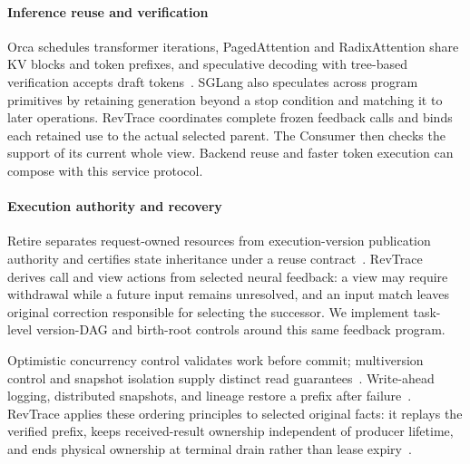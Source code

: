 \paragraph{Inference reuse and verification}
Orca schedules transformer iterations, PagedAttention and RadixAttention
share KV blocks and token prefixes, and speculative decoding with
tree-based verification accepts draft
tokens~\cite{yu2022orca,kwon2023pagedattention,zheng2024sglang,leviathan2023speculative,miao2024specinfer}.
SGLang also speculates across program primitives by retaining generation
beyond a stop condition and matching it to later operations. RevTrace coordinates
complete frozen feedback calls and binds each retained use to the actual
selected parent. The Consumer then checks the support of its current
whole view. Backend reuse and faster token execution can compose with
this service protocol.

\paragraph{Execution authority and recovery}
Retire separates request-owned resources from execution-version
publication authority and certifies state inheritance under a reuse
contract~\cite{zhang2026retire}. RevTrace derives call and view actions
from selected neural feedback: a view may require withdrawal while a
future input remains unresolved, and an input match leaves original
correction responsible for selecting the successor. We implement
task-level version-DAG and birth-root controls around this same feedback
program.

Optimistic concurrency control validates work before commit;
multiversion control and snapshot isolation supply distinct read
guarantees~\cite{kung1981occ,bernstein1983mvcc,berenson1995isolation}.
Write-ahead logging, distributed snapshots, and lineage restore a
prefix after failure~\cite{mohan1992aries,chandy1985snapshots,zaharia2013dstreams,carbone2017flinkstate}.
RevTrace applies these ordering principles to selected original facts:
it replays the verified prefix, keeps received-result ownership
independent of producer lifetime, and ends physical ownership at
terminal drain rather than lease expiry~\cite{gray1989leases}.
